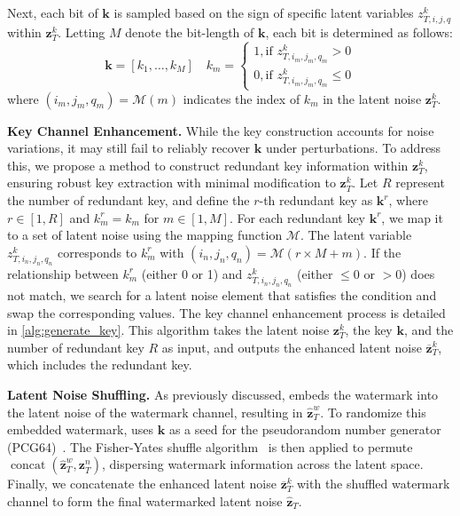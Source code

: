 Next, each bit of \( \mathbf{k} \) is sampled based on the sign of specific latent variables \( z^k_{T, i, j, q} \) within \( \mathbf{z}_T^k \). Letting \( M \) denote the bit-length of \( \mathbf{k} \), each bit is determined as follows: 
\begin{equation}
\mathbf{k} = \left[ k_1, \dots, k_{M} \right]\quad k_m = \begin{cases}
1, \text{if } z^k_{T, i_m, j_m, q_m} > 0 \\
0, \text{if } z^k_{T, i_m, j_m, q_m} \leq 0
\end{cases}
\end{equation}
where \((i_m, j_m, q_m) = \mathcal{M}(m)\) indicates the index of \(k_m\) in the latent noise \(\mathbf{z}_T^k\).



\noindent
\textbf{Key Channel Enhancement.}
While the key construction accounts for noise variations, it may still fail to reliably recover \( \mathbf{k} \) under perturbations. To address this, we propose a method to construct redundant key information within \(\mathbf{z}_T^k\), ensuring robust key extraction with minimal modification to \(\mathbf{z}_T^k\).
Let \(R\) represent the number of redundant key, and define the \(r\)-th redundant key as \(\mathbf{k}^r\), where \(r \in [1, R]\) and \(k^r_{m} = k_m\) for \(m \in [1, M]\).
For each redundant key \(\mathbf{k}^r\), we map it to a set of latent noise using the mapping function \(\mathcal{M}\). The latent variable \(z^k_{T, i_n, j_n, q_n}\) corresponds to \(k^r_{m}\) with \((i_n, j_n, q_n) = \mathcal{M}(r \times M + m)\). If the relationship between \(k^r_{m}\) (either 0 or 1) and \(z^k_{T, i_n, j_n, q_n}\) (either \(\leq 0\) or \(> 0\)) does not match, we search for a latent noise element that satisfies the condition and swap the corresponding values.
The key channel enhancement process is detailed in \cref{alg:generate_key}. This algorithm takes the latent noise \(\mathbf{z}_T^k\), the key \(\mathbf{k}\), and the number of redundant key \(R\) as input, and outputs the enhanced latent noise \(\overline{\mathbf{z}}_T^{k}\), which includes the redundant key. 

\noindent
\textbf{Latent Noise Shuffling.}
As previously discussed, \tool embeds the watermark into the latent noise of the watermark channel, resulting in \(\hat{\mathbf{z}}_T^w\). To randomize this embedded watermark, \tool uses \( \mathbf{k} \) as a seed for the pseudorandom number generator (PCG64)~\cite{oneill:pcg2014}. The Fisher-Yates shuffle algorithm~\cite{Fisher_Yates-AFP} is then applied to permute \( \operatorname{concat}(\hat{\mathbf{z}}_T^w, \mathbf{z}_T^n) \), dispersing watermark information across the latent space. Finally, we concatenate the enhanced latent noise \(\overline{\mathbf{z}}_T^{k}\) with the shuffled watermark channel to form the final watermarked latent noise \(\hat{\mathbf{z}}_T\).

